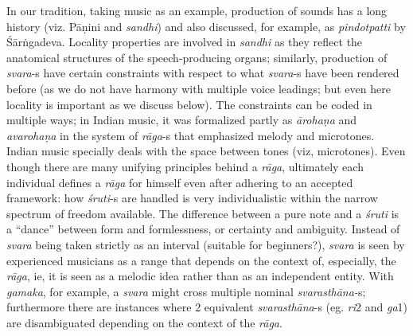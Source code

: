 In our tradition, taking music as an example, production of sounds has a long history (viz. Pāṇini and \textsl{sandhi}) and also discussed, for example, as \textsl{pindotpatti} by Śārṅgadeva. Locality properties are involved in \textsl{sandhi} as they reflect the anatomical structures of the speech-producing organs; similarly, production of \textsl{svara}-s have certain constraints with respect to what \textsl{svara}-s have been rendered before (as we do not have harmony with multiple voice leadings; but even here locality is important as we discuss below). The constraints can be coded in multiple ways; in Indian music, it was formalized partly as \textsl{ārohaṇa} and \textsl{avarohaṇa} in the system of \textsl{rāga}-s that emphasized melody and microtones. Indian music specially deals with the space between tones (viz, microtones). Even though there are many unifying principles behind a \textsl{rāga}, ultimately each individual defines a \textsl{rāga} for himself even after adhering to an accepted framework: how \textsl{śruti}-s are handled is very individualistic within the narrow spectrum of freedom available. The difference between a pure note and a \textsl{śruti} is a “dance” between form and formlessness, or certainty and ambiguity. Instead of \textsl{svara} being taken strictly as an interval (suitable for beginners?), \textsl{svara} is seen by experienced musicians as a range that depends on the context of, especially, the \textsl{rāga}, ie, it is seen as a melodic idea rather than as an independent entity. With \textsl{gamaka}, for example, a \textsl{svara} might cross multiple nominal \textsl{svarasthāna-}s; furthermore there are instances where 2 equivalent \textsl{svarasthāna}-s (eg. \textsl{ri}2 and \textsl{ga}1) are disambiguated depending on the context of the \textsl{rāga}.

